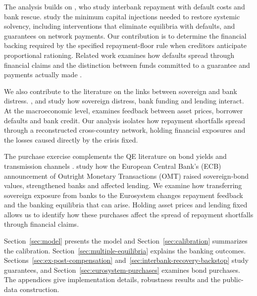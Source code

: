\documentclass[preprint,12pt,authoryear]{elsarticle}
\begin{document}
The analysis builds on \citet{RogersVeraart2013}, who study interbank repayment with default costs and bank rescue. \citet{JacksonPernoud2024} study the minimum capital injections needed to restore systemic solvency, including interventions that eliminate equilibria with defaults, and guarantees on network payments. Our contribution is to determine the financial backing required by the specified repayment-floor rule when creditors anticipate proportional rationing. Related work examines how defaults spread through financial claims \citep{ElliottGolubJackson2014} and the distinction between funds committed to a guarantee and payments actually made \citep{RochUhlig2018}.

We also contribute to the literature on the links between sovereign and bank distress. \citet{GennaioliMartinRossi2014}, \citet{AcharyaDrechslerSchnabl2014} and \citet{Bocola2016} study how sovereign distress, bank funding and lending interact. At the macroeconomic level, \citet{vonPeter2009} examines feedback between asset prices, borrower defaults and bank credit. Our analysis isolates how repayment shortfalls spread through a reconstructed cross-country network, holding financial exposures and the losses caused directly by the crisis fixed.

The purchase exercise complements the QE literature on bond yields and transmission channels \citep{GagnonEtAl2011,KrishnamurthyVissingJorgensen2011,AltavillaCarboniMotto2021}. \citet{AcharyaEisertEufingerHirsch2019} study how the European Central Bank's (ECB) announcement of Outright Monetary Transactions (OMT) raised sovereign-bond values, strengthened banks and affected lending. We examine how transferring sovereign exposure from banks to the Eurosystem changes repayment feedback and the banking equilibria that can arise. Holding asset prices and lending fixed allows us to identify how these purchases affect the spread of repayment shortfalls through financial claims.

Section~\ref{sec:model} presents the model and Section~\ref{sec:calibration} summarizes the calibration. Section~\ref{sec:multiple-equilibria} explains the banking outcomes. Sections~\ref{sec:ex-post-compensation} and~\ref{sec:interbank-recovery-backstop} study guarantees, and Section~\ref{sec:eurosystem-purchases} examines bond purchases. The appendices give implementation details, robustness results and the public-data construction.




\end{document}

